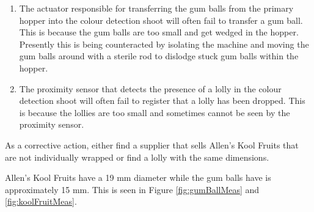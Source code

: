 			\begin{enumerate}
				\item The actuator responsible for transferring the gum balls from the primary hopper into the colour detection shoot will often fail to transfer a gum ball. This is because the gum balls are too small and get wedged in the hopper. Presently this is being counteracted by isolating the machine and moving the gum balls around with a sterile rod to dislodge stuck gum balls within the hopper.
				\item The proximity sensor that detects the presence of a lolly in the colour detection shoot will often fail to register that a lolly has been dropped. This is because the lollies are too small and sometimes cannot be seen by the proximity sensor. 
			\end{enumerate}
			
			As a corrective action, either find a supplier that sells Allen's Kool Fruits that are not individually wrapped or find a lolly with the same dimensions.
			
			Allen's Kool Fruits have a 19 mm diameter while the gum balls have is approximately 15 mm. This is seen in Figure \ref{fig:gumBallMeas} and \ref{fig:koolFruitMeas}.

